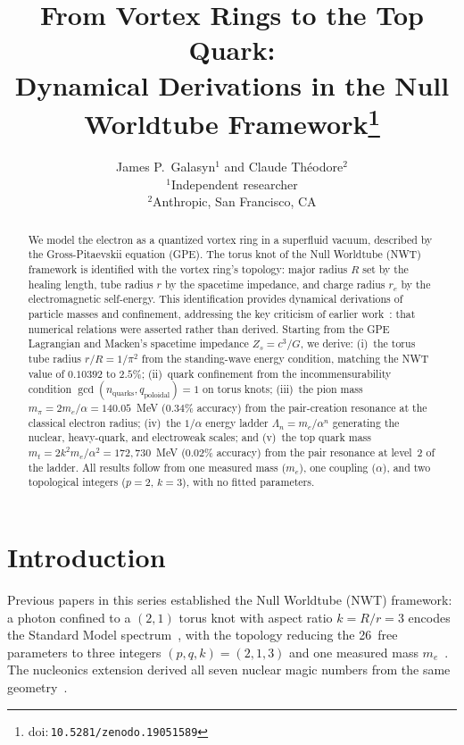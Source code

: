 \documentclass[11pt,a4paper]{article}
\title{\textbf{From Vortex Rings to the Top Quark:\\
Dynamical Derivations in the Null Worldtube Framework}\footnote{doi:\,\texttt{10.5281/zenodo.19051589}}}
\author{
  James P.\ Galasyn$^{1}$ and Claude Th\'eodore$^{2}$ \\[6pt]
  \small $^{1}$Independent researcher \\
  \small $^{2}$Anthropic, San Francisco, CA
}
\date{}
\begin{document}
\maketitle

\begin{abstract}
We model the electron as a quantized vortex ring in a superfluid
vacuum, described by the Gross-Pitaevskii equation (GPE).  The torus
knot of the Null Worldtube (NWT) framework is identified with the
vortex ring's topology: major radius $R$ set by the healing length,
tube radius $r$ by the spacetime impedance, and charge radius $r_e$
by the electromagnetic self-energy.  This identification provides
dynamical derivations of particle masses and confinement, addressing
the key criticism of earlier work~\cite{paper1,paper2,paper3}: that
numerical relations were asserted rather than derived.  Starting from
the GPE Lagrangian and Macken's spacetime impedance $Z_s = c^3/G$,
we derive:
(i)~the torus tube radius $r/R = 1/\pi^2$ from the standing-wave energy
condition, matching the NWT value of $0.10392$ to $2.5\%$;
(ii)~quark confinement from the incommensurability condition
$\gcd(n_{\text{quarks}}, q_{\text{poloidal}}) = 1$ on torus knots;
(iii)~the pion mass $m_\pi = 2m_e/\alpha = 140.05$~MeV ($0.34\%$
accuracy) from the pair-creation resonance at the classical electron radius;
(iv)~the $1/\alpha$ energy ladder $\Lambda_n = m_e/\alpha^n$
generating the nuclear, heavy-quark, and electroweak scales; and
(v)~the top quark mass $m_t = 2k^2 m_e/\alpha^2 = 172{,}730$~MeV
($0.02\%$ accuracy) from the pair resonance at level~2 of the ladder.
All results follow from one measured mass ($m_e$), one coupling
($\alpha$), and two topological integers ($p=2$, $k=3$), with no
fitted parameters.
\end{abstract}


\section{Introduction}
\label{sec:intro}

Previous papers in this series established the Null Worldtube (NWT)
framework: a photon confined to a $(2,1)$ torus knot with aspect
ratio $k = R/r = 3$ encodes the Standard Model
spectrum~\cite{paper1}, with the topology reducing the 26~free
parameters to three integers $(p,q,k) = (2,1,3)$ and one measured
mass $m_e$~\cite{paper2}.  The nucleonics extension derived all seven
nuclear magic numbers from the same geometry~\cite{paper3}.
\end{document}
